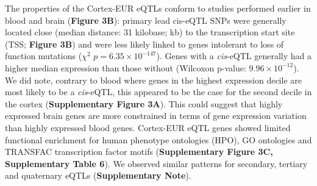 The properties of the Cortex-EUR eQTLs conform to studies performed earlier in blood\cite{vosaUnravelingPolygenicArchitecture2018} and brain\cite{dobbynLandscapeConditionalEQTL2018} (\textbf{Figure 3B}): primary lead cis-eQTL SNPs were generally located close (median distance: 31 kilobase; kb) to the transcription start site (TSS; \textbf{Figure 3B}) and were less likely linked to genes intolerant to loss of function mutations ($\chi^2$ $p = 6.35 \times 10^{-147}$). Genes with a \emph{cis}-eQTL generally had a higher median expression than those without (Wilcoxon p-value: $9.96 \times 10^{-12}$). We did note, contrary to blood where genes in the highest expression decile are most likely to be a \emph{cis}-eQTL, this appeared to be the case for the second decile in the cortex (\textbf{Supplementary Figure 3A}). This could suggest that highly expressed brain genes are more constrained in terms of gene expression variation than highly expressed blood genes. Cortex-EUR eQTL genes showed limited functional enrichment for human phenotype ontologies (HPO), GO ontologies and TRANSFAC\cite{wingenderTRANSFACDatabaseTranscription1996} transcription factor motifs (\textbf{Supplementary Figure 3C, Supplementary Table 6}). We observed similar patterns for secondary, tertiary and quaternary eQTLs (\textbf{Supplementary Note}). 

